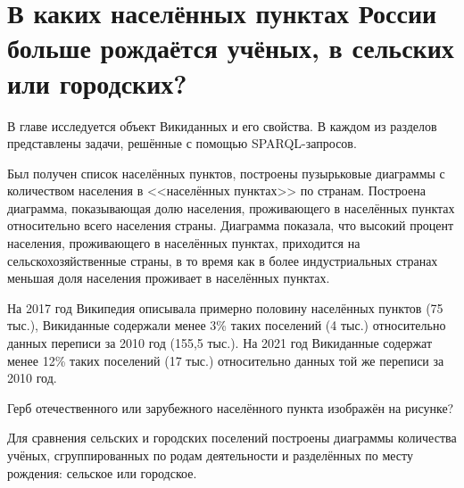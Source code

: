 \chapter{В каких населённых пунктах России больше рождаётся учёных, в сельских или городских?}
\label{ch:human-settlement}

В главе исследуется объект Викиданных  и его свойства. 
В каждом из разделов представлены задачи, решённые с помощью SPARQL-запросов. 
%

Был получен список населённых пунктов, 
построены пузырьковые диаграммы с количеством населения в <<населённых пунктах>> по странам. 
Построена диаграмма, показывающая долю населения, 
проживающего в населённых пунктах относительно всего населения страны. 
Диаграмма показала, что высокий процент населения, проживающего в населённых пунктах, 
приходится на сельскохозяйственные страны, в то время как в более индустриальных странах 
меньшая доля населения проживает в населённых пунктах. 

На 2017 год Википедия описывала примерно половину населённых пунктов (75 тыс.), 
Викиданные содержали менее 3\% таких поселений (4 тыс.) относительно данных переписи за 2010 год (155,5 тыс.). 
На 2021 год Викиданные содержат менее 12\% таких поселений (17 тыс.) 
относительно данных той же переписи за 2010 год. 

\begin{marginfigure}[0.0cm] {
\setlength{\fboxsep}{0pt}%
\setlength{\fboxrule}{1pt}%
%
}
  \caption{Герб отечественного или зарубежного населённого пункта изображён на рисунке?}%
  \label{fig:flag_question_human_settlements1}%
\end{marginfigure}
Для сравнения сельских и городских поселений 
построены диаграммы количества учёных, сгруппированных по родам деятельности 
и разделённых по месту рождения: сельское или городское.

